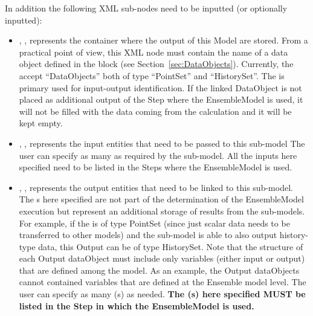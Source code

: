 \begin{itemize}
  In addition the following XML sub-nodes need to be inputted (or optionally inputted):
  \begin{itemize}
     \item {}, ,
        represents the container where the output of this Model are stored.
        From a practical point of view, this XML node must contain the name of
        a data object defined in the  block (see
        Section~\ref{sec:DataObjects}).
        Currently, the   accept ``DataObjects''  both of type
        ``PointSet'' and ``HistorySet''.
        \nb The   is primary used for input-output identification. If the linked
        DataObject is not placed as additional output of the Step where the EnsembleModel is used, it will
        not be filled with the data coming from the calculation and it will be kept empty.
     \item {}, ,
        represents the input entities that need to be passed to this sub-model
        The user can specify as many  as required by the sub-model.
        \nb All the inputs here specified need to be listed in the Steps where the EnsembleModel
        is used.
     \item {}, ,
        represents the output entities that need to be linked to this sub-model.  \nb The s here specified are not part 
        of the determination of the EnsembleModel execution but represent an additional storage of results from the
        sub-models. For example, if the  is of type PointSet (since just scalar data needs to be transferred to other 
        models) and the sub-model is able to also output history-type data, this Output can be of type HistorySet.
        Note that the structure of each Output dataObject must include only variables (either input or output) that are defined among the model.
        As an example, the Output dataObjects cannot contained variables that are defined at the Ensemble model level.
        The user can specify as many  (s) as needed. 
        \nb \textbf{The  (s) here specified MUST be listed in the Step in which the EnsembleModel is used.}
    \end{itemize}
\end{itemize}


